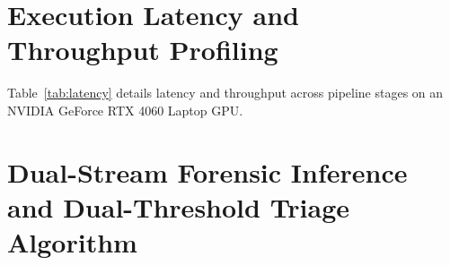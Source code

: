 \documentclass[10pt,twocolumn,letterpaper]{article}
\begin{document}
\section{Execution Latency and Throughput Profiling}
\label{app:latency}

Table~\ref{tab:latency} details latency and throughput across pipeline stages on an NVIDIA GeForce RTX 4060 Laptop GPU.

\begin{table}[t]
\centering
\small
\caption{\textbf{Execution Latency and Throughput Profiling on NVIDIA GeForce RTX 4060 Laptop GPU.} Benchmark conducted with FP16 mixed precision at resolution $256 \times 256$. The full inference pipeline incurs an amortized per-frame latency of 14.08\,ms under batch size $B = 32$ (71.0 FPS throughput), while isolated model forward execution requires 23.77\,ms ($B = 1$, 42.1 FPS) and 9.70\,ms ($B = 32$, 103.1 FPS amortized).}
\label{tab:latency}
\end{table}

\section{Dual-Stream Forensic Inference and Dual-Threshold Triage Algorithm}
\label{app:algorithm}
\end{document}
